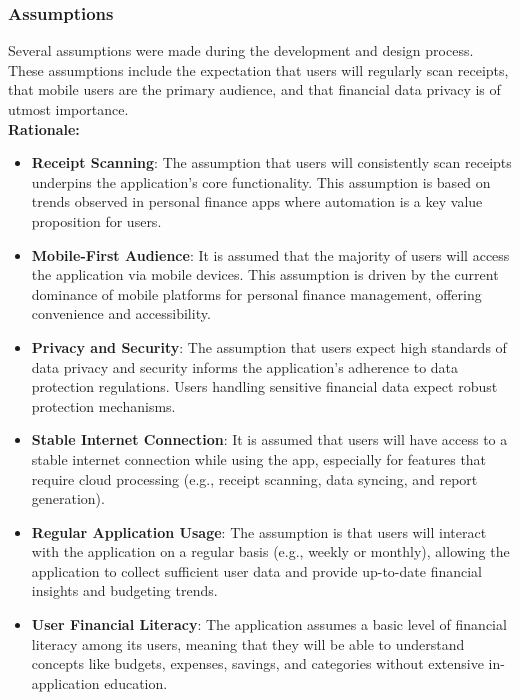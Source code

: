 \documentclass[12pt]{article}
\begin{document}
\subsubsection{Assumptions}
Several assumptions were made during the development and design process. These assumptions include the expectation that users will regularly scan receipts, that mobile users are the primary audience, and that financial data privacy is of utmost importance.\\

\noindent\textbf{Rationale:}
\begin{itemize}
    \item \textbf{Receipt Scanning}: The assumption that users will consistently
    scan receipts underpins the application's core functionality. This assumption is
    based on trends observed in personal finance apps where automation is a key
    value proposition for users.
    \item \textbf{Mobile-First Audience}: It is assumed that the majority of
    users will access the application via mobile devices. This assumption is
    driven by the current dominance of mobile platforms for personal finance
    management, offering convenience and accessibility.
    \item \textbf{Privacy and Security}: The assumption that users expect high
    standards of data privacy and security informs the application's adherence to
    data protection regulations. Users handling sensitive financial data expect
    robust protection mechanisms.
    \item \textbf{Stable Internet Connection}: It is assumed that users will
    have access to a stable internet connection while using the app, especially
    for features that require cloud processing (e.g., receipt scanning, data
    syncing, and report generation).
    \item \textbf{Regular Application Usage}: The assumption is that users will
    interact with the application on a regular basis (e.g., weekly or monthly),
    allowing the application to collect sufficient user data and provide
    up-to-date financial insights and budgeting trends.
    \item \textbf{User Financial Literacy}: The application assumes a basic
    level of financial literacy among its users, meaning that they will be able
    to understand concepts like budgets, expenses, savings, and categories
    without extensive in-application education.
\end{itemize}
\end{document}
